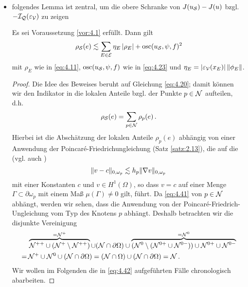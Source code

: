 \begin{itemize}
\begin{proof}
Beweis machen???
\end{proof}


\item folgendes Lemma ist zentral, um die obere Schranke von $J(u_{\mathcal S})-J(u)$ bzgl. $-\mathcal I_{\mathcal Q}(\varepsilon_{\mathcal V})$ zu zeigen

\begin{lemma}\label{lem:4.21}
Es sei Voraussetzung \ref{vor:4.1} erfüllt. Dann gilt
\begin{align}
	\rho_{\mathcal S}(e) \lesssim \sum_{E\in \mathcal E} \eta_E \, \lvert \rho_E\rvert + \operatorname{osc}(u_{\mathcal S},\psi,f)^2 
\end{align}
mit $\rho_E$ wie in \eqref{eq:4.11}, $\operatorname{osc} (u_{\mathcal S},\psi,f)$ wie in \eqref{eq:4.23} und $\eta_E = \lvert \varepsilon_{\mathcal V}(x_E)\rvert \, \lVert \phi_E\rVert$.
\end{lemma}

\begin{proof}
Die Idee des Beweises beruht auf Gleichung \eqref{eq:4.20}; damit können wir den Indikator in die lokalen Anteile bzgl. der Punkte $p \in \mathcal N$ aufteilen, d.h.
\begin{align}\label{eq:4.40}
	\rho_{\mathcal S} (e) = \sum_{p \in \mathcal N} \rho_p (e) \, .
\end{align}
Hierbei ist die Abschätzung der lokalen Anteile $\rho_p(e)$ abhängig von einer Anwendung der Poincaré-Friedrichungleichung (Satz \ref{satz:2.13}), die auf die \textit{} (vgl. auch \cite{Rudin})
\begin{align}\label{eq:4.41}
	\lVert v-c\rVert_{0,\omega_p} \lesssim h_p \lVert \nabla v\rVert_{0,\omega_p}
\end{align}
mit einer Konstanten $c$ und $v\in H^1(\Omega)$, so dass $v=c$ auf einer Menge $\Gamma \subset \partial \omega_p$ mit einem Maß $\mu (\Gamma)\not= 0$ gilt, führt. Da \eqref{eq:4.41} von $p\in \mathcal N$ abhängt, werden wir sehen, dass die Anwendung von der Poincaré-Friedrich-Ungleichung vom Typ des Knotens $p$ abhängt. Deshalb betrachten wir die disjunkte Vereinigung
\begin{align}\label{eq:4.42}
\begin{aligned}
	& \overbrace{\mathcal N^{++} \cup (\mathcal N^+ \setminus \mathcal N^{++})}^{=\mathcal N^+} \cup (\mathcal N \cap \partial \Omega ) \cup\overbrace{ (\mathcal N^0 \setminus (\mathcal N^{0+} \cup \mathcal N^{0-}))  \cup \mathcal N^{0+} \cup \mathcal N^{0-}}^{= \mathcal N^0} \\
	= \, & \mathcal N^+ \cup \mathcal N^0 \cup (\mathcal N \cap \partial \Omega)  = (\mathcal N \cap \Omega) \cup (\mathcal N \cap \partial \Omega) = \mathcal N \, .
\end{aligned}
\end{align}
Wir wollen im Folgenden die in \eqref{eq:4.42} aufgeführten Fälle chronologisch abarbeiten.


\end{proof}
\end{itemize}
